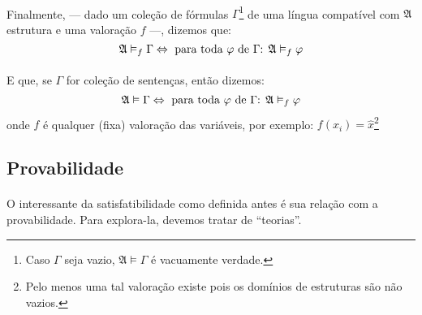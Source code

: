         \paragraph{}
            Finalmente, --- dado um coleção de fórmulas $\Gamma$\footnote{
                Caso $\Gamma$ seja vazio, $\mathfrak{A}\vDash\Gamma$ é vacuamente verdade.
            }
            de uma língua compatível com $\mathfrak A$ estrutura e uma 
            valoração $f$ ---, dizemos que:
            $$\mathfrak{A}\vDash_f\Gamma\Leftrightarrow\text{ para toda }\varphi\text{ de }\Gamma\text{: }\mathfrak{A}\vDash_f\varphi$$
        \paragraph{}
            E que, se $\Gamma$ for coleção de sentenças, então dizemos:
            $$\mathfrak{A}\vDash\Gamma\Leftrightarrow\text{ para toda }\varphi\text{ de }\Gamma\text{: }\mathfrak{A}\vDash_f\varphi$$
            onde $f$ é qualquer (fixa) valoração das variáveis, por exemplo: $f(x_i)=\hat{x}$\footnote{Pelo menos uma tal 
            valoração existe pois os domínios de estruturas são não vazios.}

        \subsection{Provabilidade}
        \paragraph{}
            O interessante da satisfatibilidade como 
            definida antes é sua relação com a
            provabilidade. Para explora-la, devemos 
            tratar de ``teorias''.
